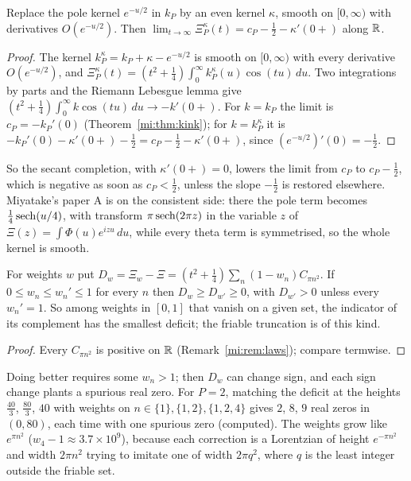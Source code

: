 \begin{proposition}\label{mi:prop:kinkbudget}
Replace the pole kernel $e^{-u/2}$ in $k_P$ by an even kernel $\kappa$, smooth on $[0,\infty)$ with derivatives $O(e^{-u/2})$. Then $\lim_{t\to\infty}\Xi_P^\kappa(t)=c_P-\tfrac12-\kappa'(0+)$ along $\mathbb{R}$.
\end{proposition}

\begin{proof}
The kernel $k_P^\kappa=k_P+\kappa-e^{-u/2}$ is smooth on $[0,\infty)$ with every derivative $O(e^{-u/2})$, and $\Xi_P^\kappa(t)=(t^2+\frac14)\int_0^\infty k_P^\kappa(u)\cos(tu)\,du$. Two integrations by parts and the Riemann Lebesgue lemma give $(t^2+\frac14)\int_0^\infty k\cos(tu)\,du\to-k'(0+)$. For $k=k_P$ the limit is $c_P=-k_P'(0)$ (Theorem~\ref{mi:thm:kink}); for $k=k_P^\kappa$ it is $-k_P'(0)-\kappa'(0+)-\frac12=c_P-\frac12-\kappa'(0+)$, since $(e^{-u/2})'(0)=-\frac12$.
\end{proof}

So the secant completion, with $\kappa'(0+)=0$, lowers the limit from $c_P$ to $c_P-\frac12$, which is negative as soon as $c_P<\frac12$, unless the slope $-\frac12$ is restored elsewhere. Miyatake's paper A \cite{Miyatake51a} is on the consistent side: there the pole term becomes $\tfrac14\operatorname{sech}(u/4)$, with transform $\pi\operatorname{sech}(2\pi z)$ in the variable $z$ of $\Xi(z)=\int\Phi(u)e^{izu}\,du$, while every theta term is symmetrised, so the whole kernel is smooth.

\begin{proposition}[Reweighting]\label{mi:prop:reweight}
For weights $w$ put $D_w=\Xi_w-\Xi=(t^2+\frac14)\sum_n(1-w_n)C_{\pi n^2}$. If $0\le w_n\le w_n'\le1$ for every $n$ then $D_w\ge D_{w'}\ge0$, with $D_{w'}>0$ unless every $w_n'=1$. So among weights in $[0,1]$ that vanish on a given set, the indicator of its complement has the smallest deficit; the friable truncation is of this kind.
\end{proposition}

\begin{proof}
Every $C_{\pi n^2}$ is positive on $\mathbb{R}$ (Remark~\ref{mi:rem:laws}); compare termwise.
\end{proof}

Doing better requires some $w_n>1$; then $D_w$ can change sign, and each sign change plants a spurious real zero. For $P=2$, matching the deficit at the heights $\frac{40}3$, $\frac{80}3$, $40$ with weights on $n\in\{1\},\{1,2\},\{1,2,4\}$ gives $2$, $8$, $9$ real zeros in $(0,80)$, each time with one spurious zero (computed). The weights grow like $e^{\pi n^2}$ ($w_4-1\approx3.7\times10^9$), because each correction is a Lorentzian of height $e^{-\pi n^2}$ and width $2\pi n^2$ trying to imitate one of width $2\pi q^2$, where $q$ is the least integer outside the friable set.

